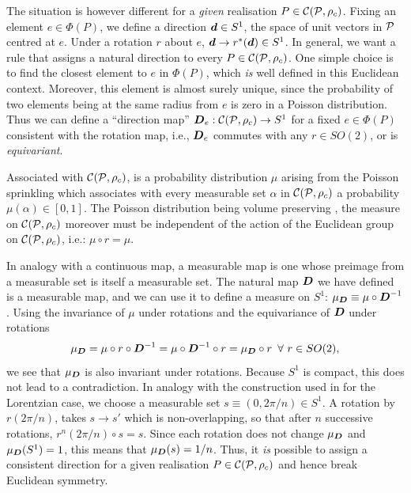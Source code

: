 The situation is however different for a \emph{given} realisation $ P \in \mathcal C(\mathcal P,\rho_c)$. Fixing an 
element $e \in \Phi(P)$,
we  define a {direction} $\vd \in S^1$, the space of unit vectors in
$\mathcal P$ centred at $e$.  Under  a rotation $r$ about $e$, $\vd \rightarrow r^*(\vd)\in S^1$.  In general, we want a rule that assigns a
natural direction to every $P \in \mathcal C(\mathcal P,\rho_c)$. One simple choice is to find the 
closest element to $e$  in $\Phi(P)$, which \emph{is}  well defined in this    Euclidean context.  Moreover, this element is almost surely unique, since the probability of  two elements being at the same radius from $e$ is zero in a Poisson distribution.
Thus we can  define  a  ``direction map''  $\vD_e: \cC(\cP,\rc) \rightarrow S^1$ for a fixed $e \in \Phi(P)$ consistent with the rotation map, i.e.,  $\vD_e$ commutes with any $r\in SO(2)$, or is \emph{equivariant}. 

Associated with  $\mathcal C(\mathcal P,\rho_c)$, is a probability distribution $\mu$ arising  from the Poisson sprinkling  which associates with
every measurable set $\alpha$ in $\mathcal C(\mathcal P,\rho_c)$ a probability $\mu(\alpha) \in [0,1]$. The Poisson distribution being
volume preserving  
\citep{stoyan},  the measure on $\mathcal C(\mathcal P,\rho_c)$  moreover must be independent of the action of the  Euclidean group on $\mathcal C(\mathcal P,\rho_c)$, i.e.:  $\mu \circ r =\mu$. 


In analogy with a continuous map, a measurable map is one whose 
preimage from  a measurable set is itself a measurable set. The natural map $\vD$ we have defined is a measurable map, and we can use it to define a measure on $S^1$: $\mu_\vD \equiv \mu \circ
\vD^{-1}$.   
Using the invariance of $\mu$ under rotations  and the equivariance of $\vD$ under rotations 
\begin{equation} 
\mu_\vD=\mu\circ r \circ \vD^{-1} = \mu \circ \vD^{-1} \circ r
=\mu_\vD \circ r \, \, \, \forall \, \, r \in SO(2),  
\end{equation} 
we see that $\mu_\vD$ is also invariant under rotations. Because 
$S^1$ is compact, this does not lead to a contradiction. In analogy with the construction used in \cite{bomhensor} for the Lorentzian case, we choose a  measurable set  $s\equiv (0,2\pi/n) \in S^1$. A  
rotation by  $r(2\pi/n)$, takes $s \rightarrow s'$ which is non-overlapping, so that after  $n$ successive rotations,
$r^n(2\pi/n)\circ s = s$. Since  each rotation does not change
$\mu_\vD$ and  $\mu_\vD(S^1)=1$, this means that $\mu_\vD(s)=1/n$.   
Thus,  it \emph{is} possible to assign a consistent direction for a given realisation $P\in \mathcal C(\mathcal P,\rho_c)$ and hence break
Euclidean symmetry. 

